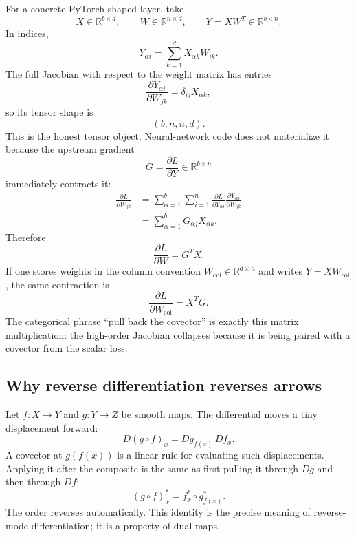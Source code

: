 For a concrete PyTorch-shaped layer, take
\[
  X\in\mathbb R^{b\times d},\qquad
  W\in\mathbb R^{n\times d},\qquad
  Y=XW^T\in\mathbb R^{b\times n}.
\]
In indices,
\[
  Y_{\alpha i}=\sum_{k=1}^d X_{\alpha k}W_{ik}.
\]
The full Jacobian with respect to the weight matrix has entries
\[
  \frac{\partial Y_{\alpha i}}{\partial W_{jk}}
  =\delta_{ij}X_{\alpha k},
\]
so its tensor shape is
\[
  (b,n,n,d).
\]
This is the honest tensor object.  Neural-network code does not materialize it because the upstream gradient
\[
  G=\frac{\partial L}{\partial Y}\in\mathbb R^{b\times n}
\]
immediately contracts it:
\[
\begin{aligned}
  \frac{\partial L}{\partial W_{jk}}
  &=
  \sum_{\alpha=1}^b\sum_{i=1}^n
  \frac{\partial L}{\partial Y_{\alpha i}}
  \frac{\partial Y_{\alpha i}}{\partial W_{jk}}\\
  &=
  \sum_{\alpha=1}^b G_{\alpha j}X_{\alpha k}.
\end{aligned}
\]
Therefore
\[
  \boxed{\displaystyle \frac{\partial L}{\partial W}=G^TX.}
\]
If one stores weights in the column convention \(W_{\mathrm{col}}\in\mathbb R^{d\times n}\) and writes \(Y=XW_{\mathrm{col}}\), the same contraction is
\[
  \frac{\partial L}{\partial W_{\mathrm{col}}}=X^TG.
\]
The categorical phrase ``pull back the covector'' is exactly this matrix multiplication: the high-order Jacobian collapses because it is being paired with a covector from the scalar loss.

\subsection*{Why reverse differentiation reverses arrows}

Let $f:X\to Y$ and $g:Y\to Z$ be smooth maps. The differential moves a tiny displacement forward:
\[
 D(g\circ f)_x=Dg_{f(x)}\,Df_x.
\]
A covector at $g(f(x))$ is a linear rule for evaluating such displacements. Applying it after the composite is the same as first pulling it through $Dg$ and then through $Df$:
\[
 \boxed{(g\circ f)^*_x=f_x^*\circ g^*_{f(x)}.}
\]
The order reverses automatically. This identity is the precise meaning of reverse-mode differentiation; it is a property of dual maps.

